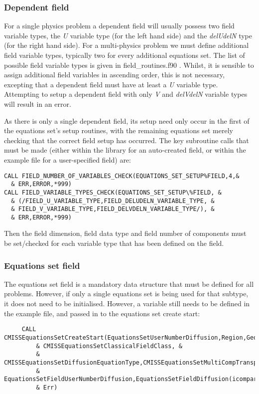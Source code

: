 \subsubsection{Dependent field}

For a single physics problem a dependent field will usually possess two field variable types, the \textit{U} variable type (for the left hand side) and the \textit{delUdelN} type (for the right hand side). For a multi-physics problem we must define additional field variable types, typically two for every additional equations set. The list of possible field variable types is given in field\_routines.f90 . Whilst, it is sensible to assign additional field variables in ascending order, this is not necessary, excepting that a dependent field must have at least a \textit{U} variable type. Attempting to setup a dependent field with only \textit{V} and \textit{delVdelN} variable types will result in an error.

As there is only a single dependent field, its setup need only occur in the first of the equations set's setup routines, with the remaining equations set merely checking that the correct field setup has occurred. The key subroutine calls that must be made (either within the library for an auto-created field, or within the example file for a user-specified field) are:

\begin{lstlisting}
CALL FIELD_NUMBER_OF_VARIABLES_CHECK(EQUATIONS_SET_SETUP%FIELD,4,&
  & ERR,ERROR,*999)
CALL FIELD_VARIABLE_TYPES_CHECK(EQUATIONS_SET_SETUP\%FIELD, &
  & (/FIELD_U_VARIABLE_TYPE,FIELD_DELUDELN_VARIABLE_TYPE, &
  & FIELD_V_VARIABLE_TYPE,FIELD_DELVDELN_VARIABLE_TYPE/), &
  & ERR,ERROR,*999)
\end{lstlisting}
Then the field dimension, field data type and field number of components must be set/checked for each variable type that has been defined on the field.

\subsubsection{Equations set field}

The equations set field is a mandatory data structure that must be defined for all problems. However, if only a single equations set is being used for that subtype, it does not need to be initialised. However, a variable still needs to be defined in the example file, and passed in to the equations set create start:

\begin{lstlisting}
     CALL CMISSEquationsSetCreateStart(EquationsSetUserNumberDiffusion,Region,GeometricField,&
         & CMISSEquationsSetClassicalFieldClass, &
         & CMISSEquationsSetDiffusionEquationType,CMISSEquationsSetMultiCompTransportDiffusionSubtype,&
         & EquationsSetFieldUserNumberDiffusion,EquationsSetFieldDiffusion(icompartment),EquationsSetDiffusion(icompartment),&
         & Err)
\end{lstlisting}

